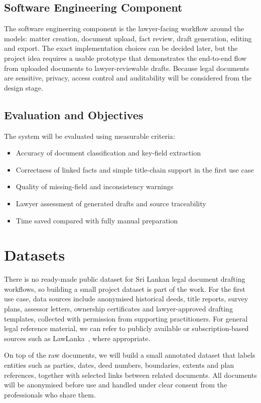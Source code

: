 \documentclass[11pt,a4paper]{article}
\begin{document}
\subsection{Software Engineering Component}
The software engineering component is the lawyer-facing workflow around the models:
matter creation, document upload, fact review, draft generation, editing and export.
The exact implementation choices can be decided later, but the project idea requires a
usable prototype that demonstrates the end-to-end flow from uploaded documents to
lawyer-reviewable drafts. Because legal documents are sensitive, privacy, access control
and auditability will be considered from the design stage.

\subsection{Evaluation and Objectives}
The system will be evaluated using measurable criteria:
\begin{itemize}[itemsep=0pt, topsep=0pt]
  \item Accuracy of document classification and key-field extraction
  \item Correctness of linked facts and simple title-chain support in the first use case
  \item Quality of missing-field and inconsistency warnings
  \item Lawyer assessment of generated drafts and source traceability
  \item Time saved compared with fully manual preparation
\end{itemize}

\section{Datasets}

There is no ready-made public dataset for Sri Lankan legal document drafting workflows,
so building a small project dataset is part of the work. For the first use case, data
sources include anonymised historical deeds, title reports, survey plans, assessor
letters, ownership certificates and lawyer-approved drafting templates, collected with
permission from supporting practitioners. For general legal reference material, we can
refer to publicly available or subscription-based sources such as
LawLanka~\cite{lawlanka}, where appropriate.

On top of the raw documents, we will build a small annotated dataset that labels
entities such as parties, dates, deed numbers, boundaries, extents and plan references,
together with selected links between related documents. All documents will be anonymised
before use and handled under clear consent from the professionals who share them.
\end{document}

